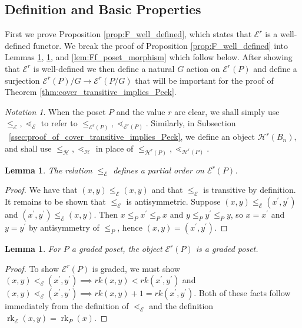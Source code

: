 \documentclass[10 pt]{amsart}
\theoremstyle{plain}
\newtheorem{lem}[thm]{Lemma}
\theoremstyle{definition}
\theoremstyle{remark}
\newtheorem*{note*}{Notation}
\numberwithin{equation}{section}
\newcommand\ssec{\subsection}
\newcommand\rk{\operatorname{rk}}
\begin{document}
\ssec{Definition and Basic Properties}\label{ssec:definition_and_basic_properties}
First we prove Proposition \ref{prop:F_well_defined}, which states that $\mathcal E^r$ is a well-defined functor.  We break the proof of Proposition \ref{prop:F_well_defined} into Lemmas \ref{lem:f_partial_order}, \ref{lem:FP_graded_poset}, and \ref{lem:Ff_poset_morphism} which follow below.  After showing that $\mathcal E^r$ is well-defined we then define a natural $G$ action on $\mathcal E^r(P)$ and define a surjection $\mathcal E^r(P)/G\rightarrow \mathcal E^r(P/G)$ that will be important for the proof of Theorem \ref{thm:cover_transitive_implies_Peck}.

\begin{note*}
When the poset $P$ and the value $r$ are clear, we shall simply use $\leq_{\mathcal E},\lessdot_{\mathcal E}$ to refer to $\leq_{\mathcal E^r(P)},\lessdot_{\mathcal E^r(P)}.$ Similarly, in Subsection ~\ref{ssec:proof_of_cover_transitive_implies_Peck}, we define an object $\mathcal H^r(B_n),$ and shall use $\leq_{\mathcal H},\lessdot_{\mathcal H}$ in place of $\leq_{\mathcal H^r(P)},\lessdot_{\mathcal H^r(P)}.$
\end{note*}

\begin{lem}\label{lem:f_partial_order}
The relation $\le_{\mathcal E}$ defines a partial order on $\mathcal E^r(P)$.
\end{lem}

\begin{proof}
We have that $(x, y)\le_{\mathcal E} (x, y)$ and that $\le_{\mathcal E}$ is transitive by definition.  It remains to be shown that $\le_{\mathcal E}$ is antisymmetric.  Suppose $(x, y)\le_{\mathcal E} (x^\prime, y^\prime)$ and $(x^\prime, y^\prime)\le_{\mathcal E} (x, y)$.  Then $x\le_P x^\prime \le_P x$ and $y\le_P y^\prime \le_P y$, so $x = x^\prime$ and $y=y^\prime$ by antisymmetry of $\le_P$, hence $(x, y) = (x^\prime, y^\prime)$.
\end{proof}

\begin{lem}\label{lem:FP_graded_poset}
For $P$ a graded poset, the object $\mathcal E^r(P)$ is a graded poset.
\end{lem}

\begin{proof}
To show $\mathcal E^r(P)$ is graded, we must show $(x, y) <_{\mathcal E} (x^\prime, y^\prime) \implies rk(x, y)<rk(x^\prime, y^\prime)$ and $(x, y) \lessdot_{\mathcal E} (x^\prime, y^\prime) \implies rk(x, y)+1 = rk(x^\prime , y^\prime)$.  Both of these facts follow immediately from the definition of $\lessdot_{\mathcal E}$ and the definition $\rk_{\mathcal E}(x, y) = \rk_P(x)$.

\end{proof}
\end{document}

